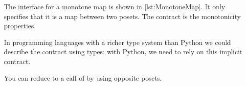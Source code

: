 
The interface for a monotone map is shown in \cref{lst:MonotoneMap}.
It only specifies that it is a map between two posets.
The contract is the monotonicity properties.

In programming languages with a richer type system than Python we could describe the contract using types; with Python, we need to rely on this implicit contract.


\begin{widepar}
\end{widepar}

\begin{hint}
    You can reduce  to a call of  by using opposite posets.
\end{hint}
